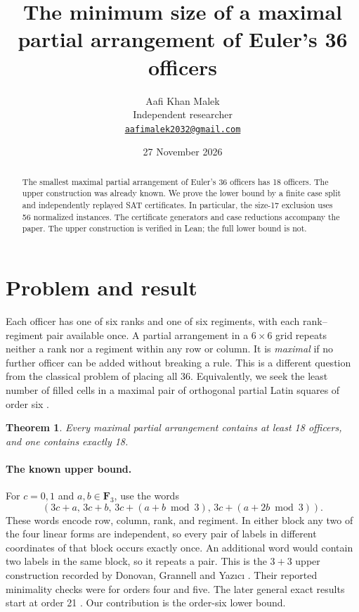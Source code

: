 \documentclass[11pt,letterpaper]{article}
\title{The minimum size of a maximal partial arrangement of Euler's 36 officers}
\author{Aafi Khan Malek\\
\small Independent researcher\\
\small\href{mailto:aafimalek2032@gmail.com}{\texttt{aafimalek2032@gmail.com}}}
\date{27 November 2026}
\newtheorem{theorem}{Theorem}
\begin{document}
\maketitle

\begin{abstract}
The smallest maximal partial arrangement of Euler's 36 officers has 18
officers. The upper construction was already known. We prove the lower bound
by a finite case split and independently replayed SAT certificates. In
particular, the size-17 exclusion uses 56 normalized instances. The
certificate generators and case reductions accompany the paper. The upper
construction is verified in Lean; the full lower bound is not.
\end{abstract}

\section{Problem and result}
Each officer has one of six ranks and one of six regiments, with each
rank--regiment pair available once. A partial arrangement in a $6\times6$
grid repeats neither a rank nor a regiment within any row or column. It is
\emph{maximal} if no further officer can be added without breaking a rule.
This is a different question from the classical problem of placing all 36.
Equivalently, we seek the least number of filled cells in a maximal pair of
orthogonal partial Latin squares of order six \cite{dgy25}.

\begin{theorem}
Every maximal partial arrangement contains at least 18 officers, and one
contains exactly 18.
\end{theorem}

\paragraph{The known upper bound.}
For $c=0,1$ and $a,b\in\mathbf F_3$, use the words
\[
 (3c+a,\,3c+b,\,3c+(a+b\bmod 3),\,3c+(a+2b\bmod 3)).
\]
These words encode row, column, rank, and regiment. In either block any two
of the four linear forms are independent, so every pair of labels in
different coordinates of that block occurs exactly once. An additional
word would contain two labels in the same block, so it repeats a pair.
This is the $3+3$ upper construction recorded by Donovan, Grannell and
Yaz\i c\i{} \cite[Table~1]{dgy25}. Their reported minimality checks were
for orders four and five. The later general exact results start at order
21 \cite{dgy26,dgy26b}. Our contribution is the order-six lower bound.
\end{document}

